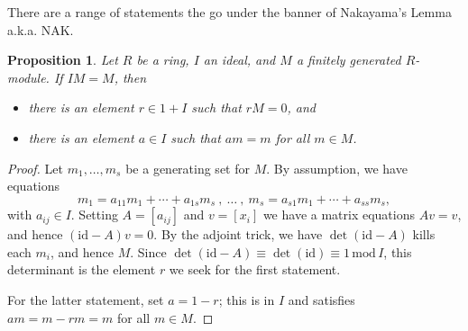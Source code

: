 \documentclass{amsart}[12pt]
\newcommand{\m}{{\mathfrak m}}
\numberwithin{equation}{section}
\theoremstyle{plain} %
\newtheorem{proposition}[equation]{Proposition}
\theoremstyle{definition}
\newtheorem{example}[equation]{Example}
\theoremstyle{remark}
\begin{document}



There are a range of statements the go under the banner of Nakayama's Lemma a.k.a. NAK. 

\begin{proposition}
	Let $R$ be a ring, $I$ an ideal, and $M$ a finitely generated $R$-module. 
	If $IM = M$, then 
	\begin{itemize}
		\item there is an element $r\in 1 + I$ such that $rM=0$, and
		\item there is an element $a\in I$ such that $am=m$ for all $m\in M$.
	\end{itemize}
\end{proposition}
\begin{proof}
	Let $m_1,\dots,m_s$ be a generating set for $M$. By assumption, we have equations
	\[ m_1 = a_{11} m_1 + \cdots + a_{1s} m_s \ , \ \dots \ , \ m_s = a_{s1} m_1 + \cdots + a_{ss} m_s,\]
	with $a_{ij}\in I$. Setting $A=[a_{ij}]$ and $v=[x_i]$ we have a matrix equations $Av=v$, and hence $(\mathrm{id} - A)v=0$. By the adjoint trick, we have $\det(\mathrm{id} - A)$ kills each $m_i$, and hence $M$. Since $\det(\mathrm{id}-A)\equiv \det(\mathrm{id})  \equiv 1 \,\mathrm{mod}\, I$, this determinant is the element $r$ we seek for the first statement.
	
	For the latter statement, set $a=1-r$; this is in $I$ and satisfies $am=m-rm=m$ for all $m\in M$.
\end{proof}

\end{document}
